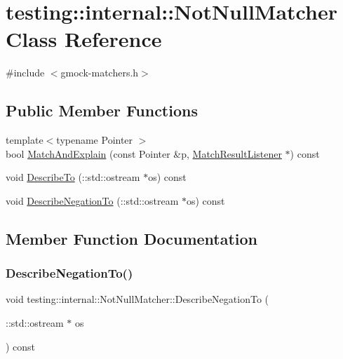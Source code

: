 \hypertarget{classtesting_1_1internal_1_1_not_null_matcher}{}\section{testing\+:\+:internal\+:\+:Not\+Null\+Matcher Class Reference}
\label{classtesting_1_1internal_1_1_not_null_matcher}


{\ttfamily \#include $<$gmock-\/matchers.\+h$>$}

\subsection*{Public Member Functions}
\begin{DoxyCompactItemize}
\item 
{\footnotesize template$<$typename Pointer $>$ }\\bool \hyperlink{classtesting_1_1internal_1_1_not_null_matcher_a8c4b04f9a91550176a6e23652f592b8e}{Match\+And\+Explain} (const Pointer \&p, \hyperlink{classtesting_1_1_match_result_listener}{Match\+Result\+Listener} $\ast$) const
\item 
void \hyperlink{classtesting_1_1internal_1_1_not_null_matcher_ac2ef2de5833c135e74e47e40484442d1}{Describe\+To} (\+::std\+::ostream $\ast$os) const
\item 
void \hyperlink{classtesting_1_1internal_1_1_not_null_matcher_a5b9c4335e8e4465e48fc73d185402ebd}{Describe\+Negation\+To} (\+::std\+::ostream $\ast$os) const
\end{DoxyCompactItemize}


\subsection{Member Function Documentation}
\mbox{\label{classtesting_1_1internal_1_1_not_null_matcher_a5b9c4335e8e4465e48fc73d185402ebd}} 
\subsubsection{\texorpdfstring{Describe\+Negation\+To()}{DescribeNegationTo()}}
{\footnotesize\ttfamily void testing\+::internal\+::\+Not\+Null\+Matcher\+::\+Describe\+Negation\+To (\begin{DoxyParamCaption}\item[{\+::std\+::ostream $\ast$}]{os }\end{DoxyParamCaption}) const\hspace{0.3cm}{\ttfamily [inline]}}


